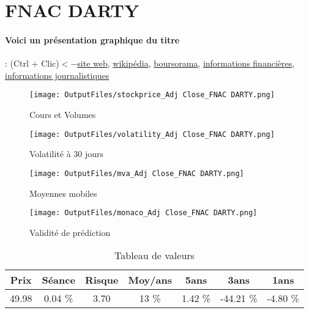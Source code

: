 \documentclass[11pt,a4paper]{report}%
\begin{document}
\newpage

\section{FNAC DARTY}

\paragraph{Voici un présentation graphique du titre} : (Ctrl + Clic)$<-$\href{http://www.fnacdarty.com/finance/}{site web}, \href{https://fr.wikipedia.org/wiki/Fnac_Darty}{wikipédia}, \href{https://www.boursorama.com/cours/1rPFNAC}{boursorama}, \href{https://www.qwant.com/?q=site:https:%2f%2fwww.easybourse.com%2faction-societe%2fFNAC-DARTY&t=web&client=ext-firefox-hp}{informations financières}, \href{https://bourse.lerevenu.com/cours-de-bourse/fiche-valeur-synthese/FNAC-DARTY/FNAC-FR}{informations journalistiques}
\begin{figure}[!htb]
   \begin{minipage}{0.5\textwidth}
     \centering
     \texttt{[image: OutputFiles/stockprice\_Adj Close\_FNAC DARTY.png]}
     \caption{Cours et Volumes}\label{Fig:price_FNAC DARTY}
   \end{minipage}\hfill
   \begin{minipage}{0.5\textwidth}
     \centering
     \texttt{[image: OutputFiles/volatility\_Adj Close\_FNAC DARTY.png]}
     \caption{Volatilité à 30 jours}\label{Fig:volat_FNAC DARTY}
   \end{minipage}
\end{figure}
\begin{figure}[!htb]
   \begin{minipage}{0.5\textwidth}
     \centering
     \texttt{[image: OutputFiles/mva\_Adj Close\_FNAC DARTY.png]}
     \caption{Moyennes mobiles}\label{Fig:mva_FNAC DARTY}
   \end{minipage}\hfill
   \begin{minipage}{0.5\textwidth}
     \centering
     \texttt{[image: OutputFiles/monaco\_Adj Close\_FNAC DARTY.png]}
     \caption{Validité de prédiction}\label{Fig:prediction_FNAC DARTY}
   \end{minipage}
\end{figure}

\begin{table}[H]
  \centering
    \begin{tabular}{|c|c|c|c|c|c|c|}
    \hline
    Prix & Séance & Risque  & Moy/ans & 5ans & 3ans & 1ans \\
    \hline
    49.98 &    0.04 \%    & 3.70 & 13 \% & 1.42 \% & -44.21 \% & -4.80 \% \\
    \hline
    \end{tabular}%
        \label{tab:table_FNAC DARTY}%
      \caption{Tableau de valeurs}
\end{table}%
\end{document}
